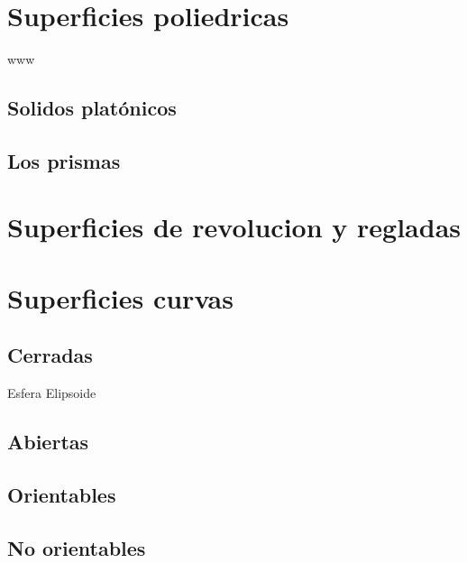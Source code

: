 \documentclass[
  16pt,
]{krantz}
\theoremstyle{definition}
\theoremstyle{definition}
\theoremstyle{definition}
\theoremstyle{definition}
\theoremstyle{remark}
\begin{document}
\hypertarget{superficies-poliedricas}{%
\section{Superficies poliedricas}\label{superficies-poliedricas}}

www

\hypertarget{solidos-platuxf3nicos}{%
\subsection{Solidos platónicos}\label{solidos-platuxf3nicos}}

\hypertarget{los-prismas}{%
\subsection{Los prismas}\label{los-prismas}}

\hypertarget{superficies-de-revolucion-y-regladas}{%
\section{Superficies de revolucion y regladas}\label{superficies-de-revolucion-y-regladas}}

\hypertarget{superficies-curvas}{%
\section{Superficies curvas}\label{superficies-curvas}}

\hypertarget{cerradas}{%
\subsection{Cerradas}\label{cerradas}}

Esfera Elipsoide

\hypertarget{abiertas}{%
\subsection{Abiertas}\label{abiertas}}

\hypertarget{orientables}{%
\subsection{Orientables}\label{orientables}}

\hypertarget{no-orientables}{%
\subsection{No orientables}\label{no-orientables}}
\end{document}
